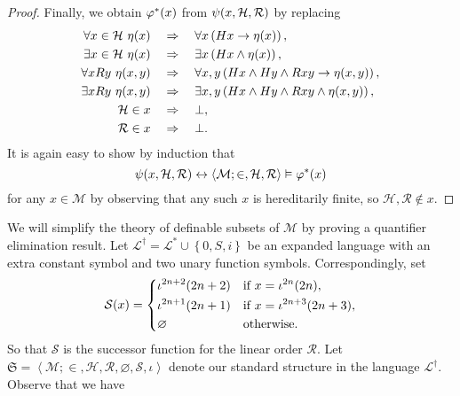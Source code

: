 \documentclass[11pt]{article}
\theoremstyle{plain}
\theoremstyle{definition}
\newcommand{\tuple}[1]{\left\langle #1 \right\rangle}
\begin{document}
\begin{proof}
  Finally, we obtain $\varphi^*\mleft(x\mright)$ from $\psi\mleft(x, \mathcal{H}, \mathcal{R}\mright)$ by replacing
  \begin{align*}
    \forall x \in \mathcal{H} \ \eta\mleft(x\mright) \quad & \Rightarrow \quad \forall x \left(Hx \rightarrow \eta\mleft(x\mright)\right),                          \\
    \exists x \in \mathcal{H} \ \eta\mleft(x\mright) \quad & \Rightarrow \quad \exists x \left(Hx \land \eta\mleft(x\mright)\right),                                \\
    \forall x R y \ \eta\mleft(x, y\mright) \quad          & \Rightarrow \quad \forall x, y \left(Hx \land Hy \land Rxy \rightarrow \eta\mleft(x, y\mright)\right), \\
    \exists x R y \ \eta\mleft(x, y\mright) \quad          & \Rightarrow \quad \exists x, y \left(Hx \land Hy \land Rxy \land \eta\mleft(x, y\mright)\right),       \\
    \mathcal{H} \in x \quad                                & \Rightarrow \quad \bot,                                                                                \\
    \mathcal{R} \in x \quad                                & \Rightarrow \quad \bot.
  \end{align*}
  It is again easy to show by induction that
  \[\psi\mleft(x, \mathcal{H}, \mathcal{R}\mright) \leftrightarrow \tuple{\mathcal{M}; \in, \mathcal{H}, \mathcal{R}} \vDash \varphi^*\mleft(x\mright)\]
  for any $x \in \mathcal{M}$ by observing that any such $x$ is hereditarily finite, so $\mathcal{H}, \mathcal{R} \not\in x$.
\end{proof}

We will simplify the theory of definable subsets of $\mathcal{M}$ by proving a quantifier elimination result. Let $\mathcal{L}^\dagger = \mathcal{L}^* \cup \left\{0, S, i\right\}$ be an expanded language with an extra constant symbol and two unary function symbols. Correspondingly, set
\[\mathcal{S}\mleft(x\mright) = \left\{\begin{aligned}
     & \iota^{2n + 2}\mleft(2n + 2\mright) &  & \text{if $x = \iota^{2n}\mleft(2n\mright)$},         \\
     & \iota^{2n + 1}\mleft(2n + 1\mright) &  & \text{if $x = \iota^{2n + 3}\mleft(2n + 3\mright)$}, \\
     & \varnothing                         &  & \text{otherwise}.
  \end{aligned}\right.\]
So that $\mathcal{S}$ is the successor function for the linear order $\mathcal{R}$. Let $\mathfrak{S} = \tuple{\mathcal{M}; \in, \mathcal{H}, \mathcal{R}, \varnothing, \mathcal{S}, \iota}$ denote our standard structure in the language $\mathcal{L}^\dagger$. Observe that we have
\end{document}
